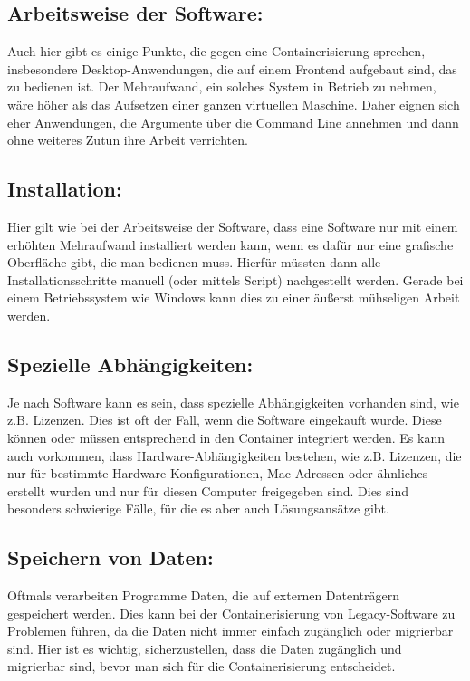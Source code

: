 \subsection{Arbeitsweise der Software:}
Auch hier gibt es einige Punkte, die gegen eine Containerisierung sprechen, insbesondere Desktop-Anwendungen, die auf einem Frontend aufgebaut sind, das zu bedienen ist.
Der Mehraufwand, ein solches System in Betrieb zu nehmen, wäre höher als das Aufsetzen einer ganzen virtuellen Maschine.
Daher eignen sich eher Anwendungen, die Argumente über die Command Line annehmen und dann ohne weiteres Zutun ihre Arbeit verrichten.

\subsection{Installation:}
Hier gilt wie bei der Arbeitsweise der Software, dass eine Software nur mit einem erhöhten Mehraufwand installiert werden kann, wenn es dafür nur eine grafische Oberfläche gibt, die man bedienen muss.
Hierfür müssten dann alle Installationsschritte manuell (oder mittels Script) nachgestellt werden. Gerade bei einem Betriebssystem wie Windows kann dies zu einer äußerst mühseligen Arbeit werden.

\subsection{Spezielle Abhängigkeiten:}
Je nach Software kann es sein, dass spezielle Abhängigkeiten vorhanden sind, wie z.B.  Lizenzen. Dies ist oft der Fall, wenn die Software eingekauft wurde.
Diese können oder müssen entsprechend in den Container integriert werden.
Es kann auch vorkommen, dass Hardware-Abhängigkeiten bestehen, wie z.B. Lizenzen, die nur für bestimmte Hardware-Konfigurationen, Mac-Adressen oder ähnliches erstellt wurden und nur für diesen Computer freigegeben sind.
Dies sind besonders schwierige Fälle, für die es aber auch Lösungsansätze gibt.

\subsection{Speichern von Daten:}
Oftmals verarbeiten Programme Daten, die auf externen Datenträgern gespeichert werden.
Dies kann bei der Containerisierung von Legacy-Software zu Problemen führen, da die Daten nicht immer einfach zugänglich oder migrierbar sind.
Hier ist es wichtig, sicherzustellen, dass die Daten zugänglich und migrierbar sind, bevor man sich für die Containerisierung entscheidet.

